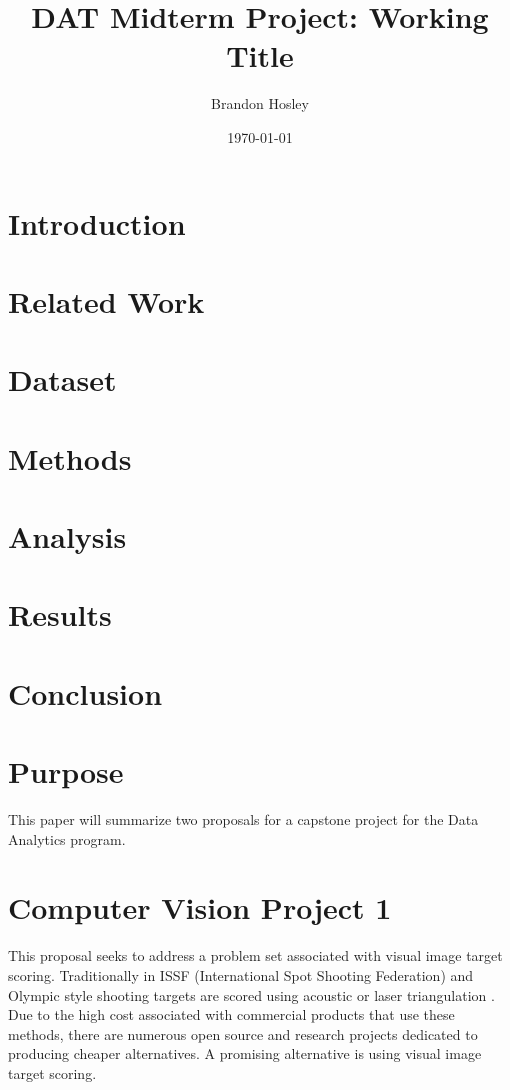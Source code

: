 \documentclass[conference]{IEEEtran}
\title{DAT Midterm Project: Working Title}
\author{Brandon Hosley}
\date{\today}
\begin{document}
	\maketitle
	
\section{Introduction}




\section{Related Work}

\section{Dataset}


\section{Methods}
\section{Analysis}
\section{Results}
\section{Conclusion}

	
\section{Purpose} 

This paper will summarize two proposals for a capstone project for the Data Analytics program.

\section{Computer Vision Project 1}

This proposal seeks to address a problem set associated with visual image target scoring. Traditionally in ISSF (International Spot Shooting Federation) and Olympic style shooting
targets are scored using acoustic or laser triangulation 
\cite{Anderson2018} \cite{SUIS}.
Due to the high cost associated with commercial products that use these methods, 
there are numerous open source \cite{etarg} \cite{freetarget}
and research projects \cite{Rudzinski2012} \cite{Stenhager2021}
dedicated to producing cheaper alternatives.
A promising alternative is using visual image target scoring.
\end{document}
